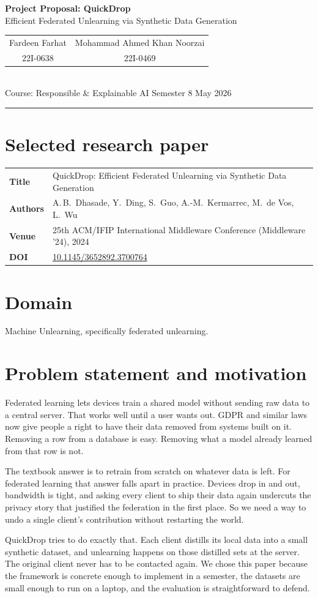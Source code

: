 \documentclass[11pt,a4paper]{article}
\makeatletter
\newcommand{\proposaltitle}{%
  \begin{center}
    {\LARGE\bfseries Project Proposal: QuickDrop}\\[2pt]
    {\large Efficient Federated Unlearning via Synthetic Data Generation}\\[8pt]
    \begin{tabular}{c@{\hspace{2.5em}}c}
      Fardeen Farhat & Mohammad Ahmed Khan Noorzai \\
      \small 22I-0638 & \small 22I-0469 \\
    \end{tabular}\\[4pt]
    {\small Course: Responsible \& Explainable AI \quad\textbar\quad Semester 8 \quad\textbar\quad May 2026}
  \end{center}
  \vspace{4pt}
  \hrule
  \vspace{8pt}
}
\makeatother
\begin{document}
\proposaltitle

\section*{Selected research paper}

\begin{tabularx}{\linewidth}{@{}lX@{}}
  \textbf{Title}    & QuickDrop: Efficient Federated Unlearning via Synthetic Data Generation \\
  \textbf{Authors}  & A.\,B.\ Dhasade, Y.\ Ding, S.\ Guo, A.-M.\ Kermarrec, M.\ de Vos, L.\ Wu \\
  \textbf{Venue}    & 25th ACM/IFIP International Middleware Conference (Middleware '24), 2024 \\
  \textbf{DOI}      & \href{https://doi.org/10.1145/3652892.3700764}{10.1145/3652892.3700764} \\
\end{tabularx}

\section*{Domain}

Machine Unlearning, specifically federated unlearning.

\section*{Problem statement and motivation}

Federated learning lets devices train a shared model without sending raw data to a central server. That works well until a user wants out. GDPR and similar laws now give people a right to have their data removed from systems built on it. Removing a row from a database is easy. Removing what a model already learned from that row is not.

The textbook answer is to retrain from scratch on whatever data is left. For federated learning that answer falls apart in practice. Devices drop in and out, bandwidth is tight, and asking every client to ship their data again undercuts the privacy story that justified the federation in the first place. So we need a way to undo a single client's contribution without restarting the world.

QuickDrop tries to do exactly that. Each client distills its local data into a small synthetic dataset, and unlearning happens on those distilled sets at the server. The original client never has to be contacted again. We chose this paper because the framework is concrete enough to implement in a semester, the datasets are small enough to run on a laptop, and the evaluation is straightforward to defend.
\end{document}
